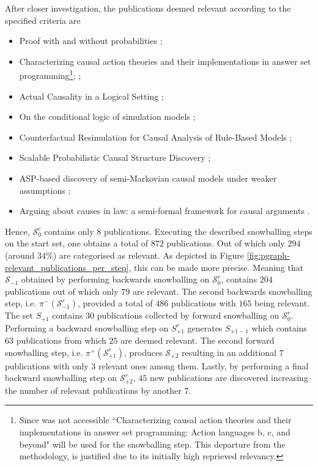 \documentclass[11pt,a4paper]{book}
\theoremstyle{definition}
\theoremstyle{definition}
\theoremstyle{definition}
\theoremstyle{remark}
\newcommand{\psetf}{S_{\mathit{+1}}}
\newcommand{\psetfb}{S_{\mathit{+1-1}}}
\newcommand{\xsetz}{\mathcal{S}_{\mathit{0}}}
\newcommand{\xsetb}{\mathcal{S}_{\mathit{-1}}}
\newcommand{\xsetf}{\mathcal{S}_{\mathit{+1}}}
\newcommand{\xsetff}{\mathcal{S}_{\mathit{+2}}}
\begin{document}
After closer investigation, the publications deemed relevant according to the specified criteria are 
\begin{itemize}
\item Proof with and without probabilities \parencite{verheij2017proof};
\item Characterizing causal action theories and their implementations in answer set programming\footnote{Since \parencite{zhang2017characterizing} was not accessible ``Characterizing causal action theories and their implementations in answer set programming: Action languages b, c, and beyond" \parencite{zhang2015characterizing} will be used for the snowballing step. This departure from the methodology, is justified due to its initially high reprieved relevancy.}; \parencite{zhang2017characterizing};
\item Actual Causality in a Logical Setting \parencite{bochman2018actual};
\item On the conditional logic of simulation models \parencite{ibeling2018conditional};
\item  Counterfactual Resimulation for Causal Analysis of Rule-Based Models \parencite{laurent2018counterfactual};
\item Scalable Probabilistic Causal Structure Discovery \parencite{sridhar2018scalable};
\item  ASP-based discovery of semi-Markovian causal models under weaker assumptions \parencite{zhang2019asp};
\item Arguing about causes in law: a semi-formal framework for causal arguments \parencite{Liepina2019ArguingAC}.
\end{itemize}
Hence, $\xsetz^c$ contains only $8$ publications.
Executing the described snowballing steps on the start set, one obtains a total of $872$ publications. Out of which only $294$ (around $34 \%$) are categorised as relevant. 
As depicted in Figure \ref{fig:pgraph-relevant_publications_per_step}, this can be made more precise. Meaning that $\xsetb$ obtained by performing backwards snowballing on $\xsetz^r$, contains $204$ publications out of which only $79$ are relevant. The second backwards snowballing step, i.e. $\pi^-(\xsetb^r)$, provided a total of $486$ publications with $165$ being relevant. The set $\psetf$ contains $30$ publications collected by forward snowballing on $\xsetz^r$. Performing a backward snowballing step on $\psetf^r$ generates $\psetfb$ which contains $63$ publications from which $25$ are deemed relevant. The second forward snowballing step, i.e. $\pi^+(\xsetf^r)$, produces $\xsetff$ resulting in an additional $7$ publications with only $3$ relevant ones among them. Lastly, by performing a final backward snowballing step on $\xsetff^r$, $45$ new publications are discovered increasing the number of relevant publications by another $7$.  
\end{document}
